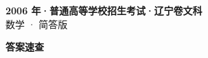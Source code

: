 \documentclass[zihao=-4, a4paper]{ctexart}
\begin{document}
\begin{center}
  {\Large\bfseries 2006 年·普通高等学校招生考试·辽宁卷文科}\\[4pt]
  {\large 数学 · 简答版}
\end{center}
\medskip
{}

\clearpage
{}
\begin{center}{\Large\bfseries 答案速查}\end{center}
\medskip

\end{document}
